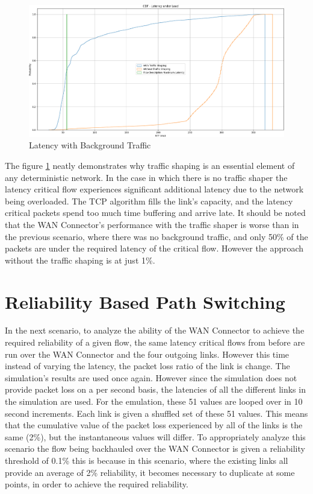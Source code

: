 \begin{figure}[h]
    \centering
        \includegraphics[height=0.66\textwidth,width=\textwidth]{fig/rrul_cdf.png}
        \caption{Latency with Background Traffic}
        \label{fig:rrul_cdf}
\end{figure}

The figure \ref{fig:rrul_cdf} neatly demonstrates why traffic shaping is an essential element of any deterministic network. In the case in which there is no traffic shaper the latency critical flow experiences significant additional latency due to the network being overloaded. The TCP algorithm fills the link's capacity, and the latency critical packets spend too much time buffering and arrive late. It should be noted that the WAN Connector's performance with the traffic shaper is worse than in the previous scenario, where there was no background traffic, and only 50\% of the packets are under the required latency of the critical flow. However the approach without the traffic shaping is at just 1\%.

\section{Reliability Based Path Switching}

In the next scenario, to analyze the ability of the WAN Connector to achieve the required reliability of a given flow, the same latency critical flows from before are run over the WAN Connector and the four outgoing links. However this time instead of varying the latency, the packet loss ratio of the link is change. The simulation's results are used once again. However since the simulation does not provide packet loss on a per second basis, the latencies of all the different links in the simulation are used. For the emulation, these 51 values are looped over in 10 second increments. Each link is given a shuffled set of these 51 values. This means that the cumulative value of the packet loss experienced by all of the links is the same (2\%), but the instantaneous values will differ. To appropriately analyze this scenario the flow being backhauled over the WAN Connector is given a reliability threshold of 0.1\% this is because in this scenario, where the existing links all provide an average of 2\% reliability, it becomes necessary to duplicate at some points, in order to achieve the required reliability. 


